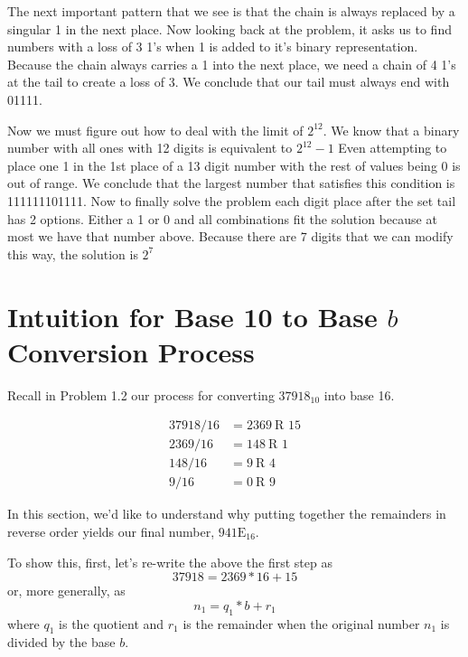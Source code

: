 \documentclass[12pt]{article}
\begin{document}
\begin{enumerate}
The next important pattern that we see is that the chain is always replaced by a singular 1 in the next place. Now looking back at the problem, it asks us to find numbers with a loss of 3 1's when 1 is added to it's binary representation. Because the chain always carries a 1 into the next place, we need a chain of 4 1's at the tail to create a loss of 3. We conclude that our tail must always end with 01111.

Now we must figure out how to deal with the limit of $2^{12}$. We know that a binary number with all ones with 12 digits is equivalent to $2^{12} - 1$ Even attempting to place one 1 in the 1st place of a 13 digit number with the rest of values being 0 is out of range. We conclude that the largest number that satisfies this condition is 111111101111. Now to finally solve the problem each digit place after the set tail has 2 options. Either a 1 or 0 and all combinations fit the solution because at most we have that number above. Because there are 7 digits that we can modify this way, the solution is $2^7$ 

\end{enumerate}

\appendix

\section{Intuition for Base 10 to Base $b$ Conversion Process}
Recall in Problem 1.2 our process for converting $37918_{10}$ into base 16.

\begin{align*}
37918/16 &= 2369~\text{R 15}\\
2369/16 &= 148~\text{R 1}\\
148/16 &= 9~\text{R 4}\\
9/16 &= 0~\text{R 9}
\end{align*}

In this section, we'd like to understand why putting together the remainders in reverse order yields our final number, $\text{941E}_{16}$.

To show this, first, let's re-write the above the first step as
\begin{equation*}
37918 = 2369 * 16 + 15
\end{equation*}
or, more generally, as
\begin{equation}
\label{general_divison}
n_1 = q_1 * b + r_1
\end{equation}
where $q_1$ is the quotient and $r_1$ is the remainder when the original number $n_1$ is divided by the base $b$.
\end{document}
